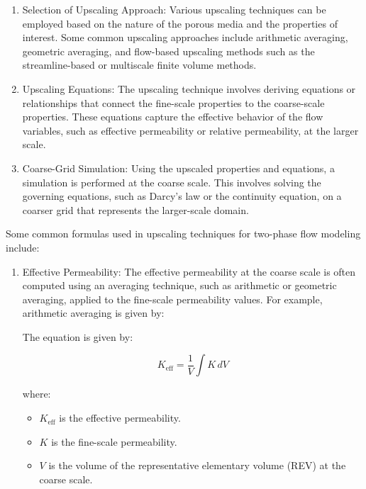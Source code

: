 {\begin{enumerate}
			\item Selection of Upscaling Approach:	Various upscaling techniques can be employed based on the nature of the porous media and the properties of interest. Some common upscaling approaches include arithmetic averaging, geometric averaging, and flow-based upscaling methods such as the streamline-based or multiscale finite volume methods.

			\item Upscaling Equations:	The upscaling technique involves deriving equations or relationships that connect the fine-scale properties to the coarse-scale properties. These equations capture the effective behavior of the flow variables, such as effective permeability or relative permeability, at the larger scale.

			\item Coarse-Grid Simulation: Using the upscaled properties and equations, a simulation is performed at the coarse scale. This involves solving the governing equations, such as Darcy's law or the continuity equation, on a coarser grid that represents the larger-scale domain.
			
		\end{enumerate}
		
		Some common formulas used in upscaling techniques for two-phase flow modeling include:

		\begin{enumerate}
		
			\item Effective Permeability: The effective permeability at the coarse scale is often computed using an averaging technique, such as arithmetic or geometric averaging, applied to the fine-scale permeability values. For example, arithmetic averaging is given by:
			
			The equation is given by:

			\[ K_{\text{eff}} = \frac{1}{V} \int K \, dV \]

			where:
			\begin{itemize}
				\item   \( K_{\text{eff}} \) is the effective permeability.
				
				\item \( K \) is the fine-scale permeability.
				
				\item  \( V \) is the volume of the representative elementary volume (REV) at the coarse scale.
				
			\end{itemize}



\end{enumerate}}
